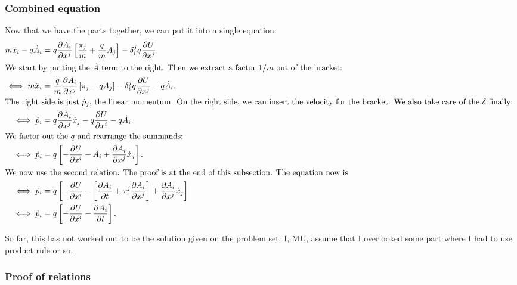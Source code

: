 \documentclass[11pt, english, fleqn, DIV=15, headinclude, BCOR=1cm]{scrartcl}
\begin{document}
\subsubsection{Combined equation}

Now that we have the parts together, we can put it into a single equation:
\begin{align*}
    m \ddot x_i - q \dot A_i &= 
    q \pd{A_i}{x^j}
    \sbr{\frac{\pi_j}m + \frac qm A_j}
    -
    \delta_i^j
    q \pd{U}{x^j}. \\
    \intertext{%
        We start by putting the $\dot A$ term to the right. Then we extract a
        factor $1/m$ out of the bracket:
    }
    \iff m \ddot x_i &= \frac qm \pd{A_i}{x^j} \sbr{\pi_j - q
    A_j} - \delta_i^j q \pd{U}{x^j} - q \dot A_i. \\
    \intertext{%
        The right side is just $\dot p_j$, the linear momentum. On the right
        side, we can insert the velocity for the bracket. We also take care of
        the $\delta$ finally:
    }
    \iff \dot p_i &= q \pd{A_i}{x^j} \dot x_j - q \pd{U}{x^i} - q \dot A_i. \\
    \intertext{%
        We factor out the $q$ and rearrange the summands:
    }
    \iff \dot p_i &= q \sbr{- \pd{U}{x^i} - \dot A_i + \pd{A_i}{x^j} \dot x_j}. \\
    \intertext{%
        We now use the second relation. The proof is at the end of this
        subsection. The equation now is
    }
    \iff \dot p_i &= q \sbr{- \pd{U}{x^i} - \sbr{\pd{A_i}t + \dot x^j
    \pd{A_i}{x^j}} + \pd{A_i}{x^j} \dot x_j} \\
    \iff \dot p_i &= q \sbr{- \pd{U}{x^i} - \pd{A_i}t}. \\
\end{align*}


So far, this has not worked out to be the solution given on the problem
set. I, MU, assume that I overlooked some part where I had to use product
rule or so.

\subsubsection{Proof of relations}
\end{document}
